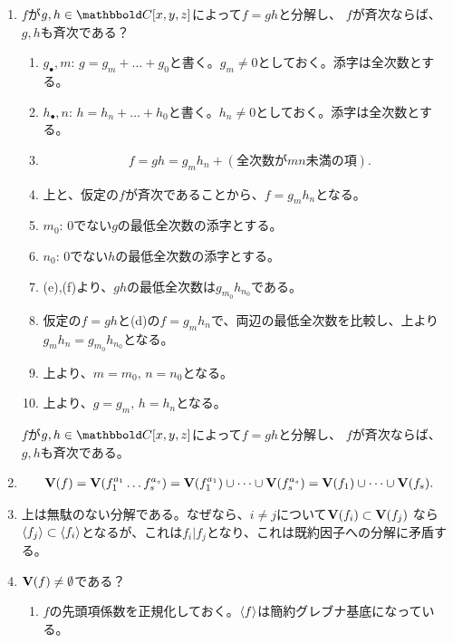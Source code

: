 \begin{myproof}
  \begin{enumerate}
    \item $f$が$g,h \in \C[x,y,z]$によって$f=gh$と分解し、
    $f$が斉次ならば、$g,h$も斉次である？
    \begin{enumerate}
      \item $g_\bullet,m$: $g=g_m + \dots + g_0$と書く。$g_m\neq 0$としておく。添字は全次数とする。
      \item $h_\bullet,n$: $h=h_n + \dots + h_0$と書く。$h_n \neq 0$としておく。添字は全次数とする。
      \item
      \begin{align}
        f = gh
        =
        g_m h_n + (全次数がmn未満の項).
      \end{align}
      \item
      上と、仮定の$f$が斉次であることから、$f=g_mh_n$となる。
      \item
      $m_0$:
      0でない$g$の最低全次数の添字とする。
      \item
      $n_0$: 0でない$h$の最低全次数の添字とする。
      \item
      (e),(f)より、$gh$の最低全次数は$g_{m_0}h_{n_0}$である。
      \item
      仮定の$f=gh$と(d)の$f=g_m h_n$で、両辺の最低全次数を比較し、上より
      $g_m h_n = g_{m_0}h_{n_0}$となる。
      \item
      上より、$m=m_0,\, n=n_0$となる。
      \item
      上より、$g=g_m,\, h=h_n$となる。
    \end{enumerate}
    $f$が$g,h \in \C[x,y,z]$によって$f=gh$と分解し、
    $f$が斉次ならば、$g,h$も斉次である。
    \item
    \begin{align}
      \textbf V(f) = \textbf V(f_1^{a_1}\dots f_s^{a_s})
      =
      \textbf V(f_1^{a_1}) \cup \dots \cup \textbf V(f_s^{a_s})
      =
      \textbf V(f_1)\cup \dots \cup \textbf V(f_s).
    \end{align}
    \item
    上は無駄のない分解である。なぜなら、$i\neq j$について$\textbf V(f_i) \subset \textbf V(f_j)$
    なら$\left\langle f_j \right\rangle \subset \left\langle f_i \right\rangle$となるが、これは$f_i | f_j$となり、これは既約因子への分解に矛盾する。
    \item
    $\textbf V(f) \neq \emptyset$である？
    \begin{enumerate}
      \item $f$の先頭項係数を正規化しておく。$\left\langle f \right\rangle$は簡約グレブナ基底になっている。

\end{enumerate}
\end{enumerate}
\end{myproof}
